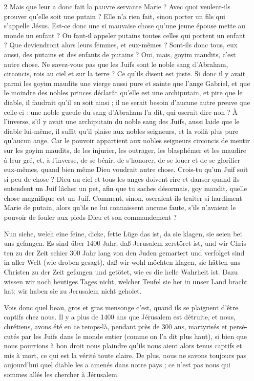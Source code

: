 \documentclass[a4paper,12pt]{article}
\newcommand\chunks[2]{%
\begin{leftcolumn*}\begin{otherlanguage}{german}%
{#1}%
\end{otherlanguage}\end{leftcolumn*}%
\begin{rightcolumn}\begin{otherlanguage}{french}%
{#2}%
\end{otherlanguage}\end{rightcolumn}%
}
\begin{document}
\begin{paracol}{2}
         {Mais que leur a donc fait la pauvre servante Marie ? Avec quoi veulent-ils prouver qu’elle soit une putain ? Elle n’a rien fait, sinon porter un fils qui s’appelle Jésus. Est-ce donc une si mauvaise chose qu’une jeune épouse mette au monde un enfant ? Ou faut-il appeler putains toutes celles qui portent un enfant ? Que deviendront alors leurs femmes, et eux-mêmes ? Sont-ils donc tous, eux aussi, des putains et des enfants de putains ? Oui, mais, goyim maudits, c’est autre chose. Ne savez-vous pas que les Juifs sont le noble sang d’Abraham, circoncis, rois au ciel et sur la terre ? Ce qu’ils disent est juste. Si donc il y avait parmi les goyim maudits une vierge aussi pure et sainte que l’ange Gabriel, et que le moindre des nobles princes déclarât qu’elle est une archiputain, et pire que le diable, il faudrait qu’il en soit ainsi ; il ne serait besoin d’aucune autre preuve que celle-ci : une noble gueule du sang d’Abraham l’a dit, qui oserait dire non ? À l’inverse, s’il y avait une archiputain du noble sang des Juifs, aussi laide que le diable lui-même, il suffit qu’il plaise aux nobles seigneurs, et la voilà plus pure qu’aucun ange. Car le pouvoir appartient aux nobles seigneurs circoncis de mentir sur les goyim maudits, de les injurier, les outrager, les blasphémer et les maudire à leur gré, et, à l’inverse, de se bénir, de s’honorer, de se louer et de se glorifier eux-mêmes, quand bien même Dieu voudrait autre chose. Crois-tu qu’un Juif soit si peu de chose ? Dieu au ciel et tous les anges doivent rire et danser quand ils entendent un Juif lâcher un pet, afin que tu saches désormais, goy maudit, quelle chose magnifique est un Juif. Comment, sinon, oseraient-ils traiter si hardiment Marie de putain, alors qu’ils ne lui connaissent aucune faute, s’ils n’avaient le pouvoir de fouler aux pieds Dieu et son commandement ?}
  \chunks{\textelp{}}
         {\textelp{}}
  \chunks{Nun siehe, welch eine feine, dicke, fette Lüge das ist, da sie klagen, sie seien bei uns gefangen. Es sind über 1400 Jahr, daß Jerusalem zerstöret ist, und wir Christen zu der Zeit schier 300 Jahr lang von den Juden gemartert und verfolget sind in aller Welt (wie droben gesagt), daß wir wohl möchten klagen, sie hätten uns Christen zu der Zeit gefangen und getötet, wie es die helle Wahrheit ist. Dazu wissen wir noch heutiges Tages nicht, welcher Teufel sie her in unser Land bracht hat; wir haben sie zu Jerusalem nicht geholet.}
         {Vois donc quel beau, gros et gras mensonge c’est, quand ils se plaignent d’être captifs chez nous. Il y a plus de 1400 ans que Jérusalem est détruite, et nous, chrétiens, avons été en ce temps-là, pendant près de 300 ans, martyrisés et persécutés par les Juifs dans le monde entier (comme on l’a dit plus haut), si bien que nous pourrions à bon droit nous plaindre qu’ils nous aient alors tenus captifs et mis à mort, ce qui est la vérité toute claire. De plus, nous ne savons toujours pas aujourd’hui quel diable les a amenés dans notre pays ; ce n’est pas nous qui sommes allés les chercher à Jérusalem.}

\end{paracol}
\end{document}
